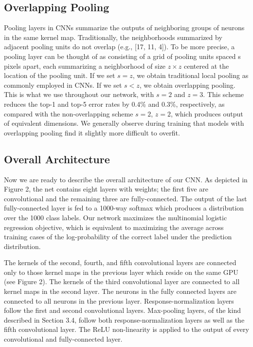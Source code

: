 \documentclass[12pt,a4paper,UTF8,twoside]{book}
\begin{document}
\hypertarget{overlapping-pooling}{%
\subsection{Overlapping Pooling}\label{overlapping-pooling}}

Pooling layers in CNNs summarize the outputs of neighboring groups of neurons in the same kernel map. Traditionally, the neighborhoods summarized by adjacent pooling units do not overlap (e.g., {[}17, 11, 4{]}). To be more precise, a pooling layer can be thought of as consisting of a grid of pooling units spaced s pixels apart, each summarizing a neighborhood of size \(z × z\) centered at the location of the pooling unit. If we set \(s = z\), we obtain traditional local pooling as commonly employed in CNNs. If we set \(s < z\), we obtain overlapping pooling. This is what we use throughout our network, with \(s = 2\) and \(z = 3\). This scheme reduces the top-1 and top-5 error rates by 0.4\% and 0.3\%, respectively, as compared with the non-overlapping scheme \(s = 2\), \(z = 2\), which produces output of equivalent dimensions. We generally observe during training that models with overlapping pooling find it slightly more difficult to overfit.

\hypertarget{overall-architecture}{%
\subsection{Overall Architecture}\label{overall-architecture}}

Now we are ready to describe the overall architecture of our CNN. As depicted in Figure 2, the net contains eight layers with weights; the first five are convolutional and the remaining three are fully-connected. The output of the last fully-connected layer is fed to a 1000-way softmax which produces a distribution over the 1000 class labels. Our network maximizes the multinomial logistic regression objective, which is equivalent to maximizing the average across training cases of the log-probability of the correct label under the prediction distribution.

The kernels of the second, fourth, and fifth convolutional layers are connected only to those kernel maps in the previous layer which reside on the same GPU (see Figure 2). The kernels of the third convolutional layer are connected to all kernel maps in the second layer. The neurons in the fully connected layers are connected to all neurons in the previous layer. Response-normalization layers follow the first and second convolutional layers. Max-pooling layers, of the kind described in Section 3.4, follow both response-normalization layers as well as the fifth convolutional layer. The ReLU non-linearity is applied to the output of every convolutional and fully-connected layer.
\end{document}
